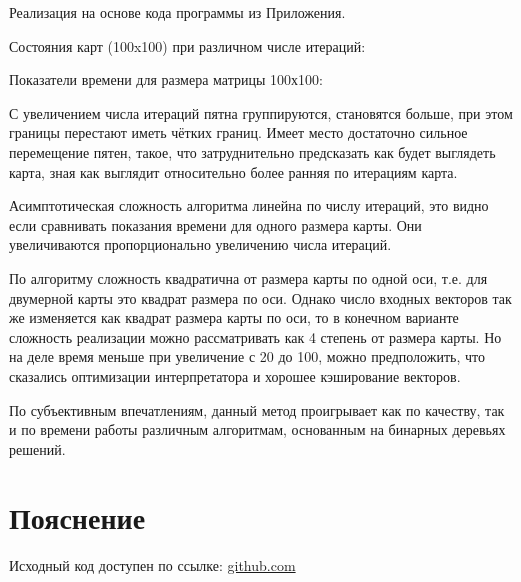 \documentclass{article} %
\begin{document}
Реализация на основе кода программы из Приложения.
\bigskip

Состояния карт (100x100) при различном числе итераций:
\begin{figure}[H]
	\centering
	\hfill
\end{figure}
\begin{figure}[H]
	\centering
	\hfill
\end{figure}

Показатели времени для размера матрицы 100х100:


С увеличением числа итераций пятна группируются,
становятся больше, при этом границы перестают иметь чётких границ.
Имеет место достаточно сильное перемещение пятен,
такое, что затруднительно предсказать как
будет выглядеть карта, зная как выглядит
относительно более ранняя по итерациям карта.

Асимптотическая сложность алгоритма линейна по числу итераций,
это видно если сравнивать показания времени для одного размера карты.
Они увеличиваются пропорционально увеличению числа итераций.

По алгоритму сложность квадратична от размера карты по одной оси,
т.е. для двумерной карты это квадрат размера по оси.
Однако число входных векторов так же изменяется как квадрат размера
карты по оси, то в конечном варианте сложность реализации
можно рассматривать как 4 степень от размера карты.
Но на деле время меньше при увеличение с 20 до 100,
можно предположить, что сказались оптимизации интерпретатора
и хорошее кэширование векторов.

По субъективным впечатлениям,
данный метод проигрывает как по качеству,
так и по времени работы различным
алгоритмам, основанным на бинарных деревьях решений.

\section{Пояснение}
Исходный код доступен по ссылке:
\href{https://github.com/SvichkarevAnatoly/Course-Python-Bioinformatics/tree/master/semester2/task11}
{github.com}
\end{document}
